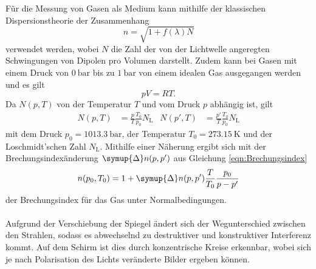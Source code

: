     Für die Messung von Gasen als Medium kann mithilfe der klassischen Dispersionstheorie der Zusammenhang
    \begin{equation*}
        n = \sqrt{1 + f(\lambda)N}
    \end{equation*}
    verwendet werden,
    wobei $N$ die Zahl der von der Lichtwelle angeregten Schwingungen von Dipolen pro Volumen darstellt.
    Zudem kann bei Gasen mit einem Druck von $\SI{0}{\bar}$ bis zu $\SI{1}{\bar}$ von einem idealen Gas ausgegangen werden und es gilt 
    \begin{equation*}
        p V = R T .
    \end{equation*}
    Da $N(p,T)$ von der Temperatur $T$ und vom Druck $p$ abhängig ist,
    gilt 
    \begin{align*}
        N(p,T) &= \frac{p}{T} \frac{T_0}{p_0} N_\text{L} & N(p',T) &= \frac{p'}{T} \frac{T_0}{p_0} N_\text{L}
    \end{align*}
    mit dem Druck $p_0 = \SI{1013.3}{\bar}$, der Temperatur $T_0 = \SI{273.15}{\kelvin}$ und der Loschmidt'schen Zahl $N_\text{L}$.
    Mithilfe einer Näherung ergibt sich mit der Brechungsindexänderung $\symup{\Delta}n(p,p')$ aus Gleichung \eqref{eqn:Brechungsindex} 
    \begin{equation}
        n(p_0,T_0) = 1 + \symup{\Delta}n(p,p') \frac{T}{T_0} \frac{p_0}{p - p'} 
    \end{equation}
    der Brechungsindex für das Gas unter Normalbedingungen.\\
    \\
    Aufgrund der Verschiebung der Spiegel ändert sich der Wegunterschied zwischen den Strahlen,
    sodass es abwechselnd zu destruktiver und konstruktiver Interferenz kommt.
    Auf dem Schirm ist dies durch konzentrische Kreise erkennbar,
    wobei sich je nach Polarisation des Lichts veränderte Bilder ergeben können.





    